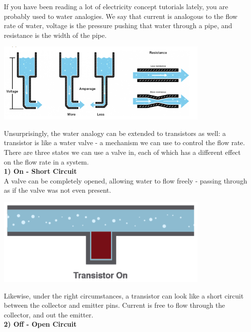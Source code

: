 \documentclass[a4paper, 11pt]{article} %
\begin{document}
If you have been reading a lot of electricity concept tutorials lately, you are probably used to water analogies. We say that current is analogous to the flow rate of water, voltage is the pressure pushing that water through a pipe, and resistance is the width of the pipe.

\begin{center}
\includegraphics[width=300pt]{tran6}
\end{center}

Unsurprisingly, the water analogy can be extended to transistors as well: a transistor is like a water valve - a mechanism we can use to control the flow rate.\\

There are three states we can use a valve in, each of which has a different effect on the flow rate in a system.\\

\textbf{1) On - Short Circuit}\\

A valve can be completely opened, allowing water to flow freely - passing through as if the valve was not even present.

\begin{center}
\includegraphics[width=300pt]{tran7}
\end{center}

Likewise, under the right circumstances, a transistor can look like a short circuit between the collector and emitter pins. Current is free to flow through the collector, and out the emitter.\\

\textbf{2) Off - Open Circuit}
\end{document}
